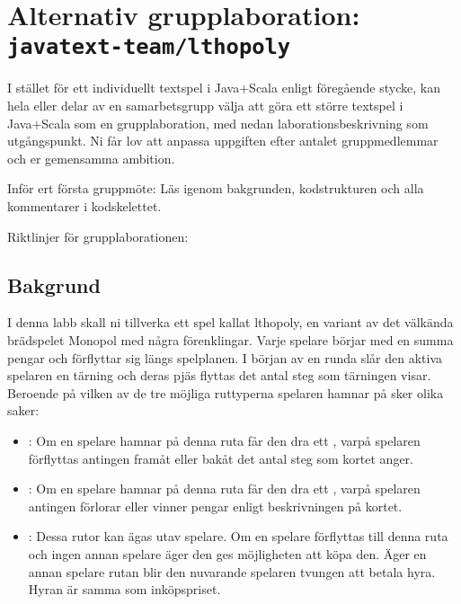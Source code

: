\clearpage
\section{Alternativ grupplaboration: \textnormal{\texttt{javatext-team/lthopoly}}}\label{section:alt:lthopoly}

I stället för ett individuellt textspel i Java+Scala enligt föregående stycke, kan hela eller delar av en samarbetsgrupp välja att göra ett större textspel i Java+Scala som en grupplaboration, med nedan laborationsbeskrivning som utgångspunkt. Ni får lov att anpassa uppgiften efter antalet gruppmedlemmar och er gemensamma ambition.

Inför ert första gruppmöte: Läs igenom bakgrunden, kodstrukturen och alla kommentarer i kodskelettet.

Riktlinjer för grupplaborationen:
\begin{itemize}[nolistsep]

\end{itemize}

\subsection{Bakgrund}
I denna labb skall ni tillverka ett spel kallat lthopoly, en variant av det välkända brädspelet Monopol med några förenklingar. Varje spelare börjar med en summa pengar och förflyttar sig längs spelplanen.
I början av en runda slår den aktiva spelaren en tärning och deras pjäs flyttas det antal steg som tärningen visar.
Beroende på vilken av de tre möjliga ruttyperna spelaren hamnar på sker olika saker:

\begin{itemize}
\item {}: Om en spelare hamnar på denna ruta får den dra ett , varpå spelaren förflyttas antingen framåt eller bakåt det antal steg som kortet anger.
\item {}: Om en spelare hamnar på denna ruta får den dra ett , varpå spelaren antingen förlorar eller vinner pengar enligt beskrivningen på kortet.
\item {}: Dessa rutor kan ägas utav spelare. Om en spelare förflyttas till denna ruta och ingen annan spelare äger den ges möjligheten att köpa den. Äger en annan spelare rutan blir den nuvarande spelaren tvungen att betala hyra. Hyran är samma som inköpspriset.
\end{itemize}

